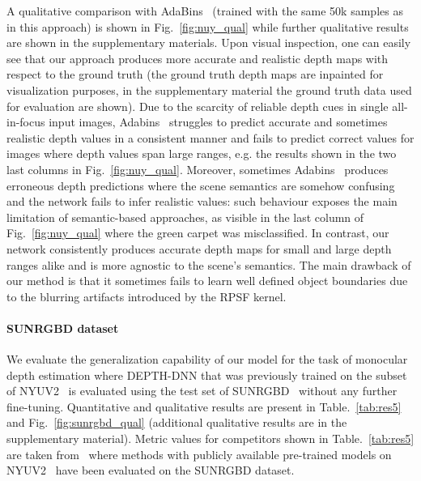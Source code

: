 \documentclass[preprint,5p,twocolumn]{elsarticle}
\begin{document}
A qualitative comparison with AdaBins~\cite{bhat2020adabins} (trained with the same 50k samples as in this approach) is shown in Fig.~\ref{fig:nuy_qual} while further qualitative results are shown in the supplementary materials. Upon visual inspection, one can easily see that our approach produces more accurate and realistic depth maps with respect to the ground truth (the ground truth depth maps are inpainted for visualization purposes, in the supplementary material the ground truth data used for evaluation are shown). 
Due to the scarcity of reliable depth cues in single all-in-focus input images, Adabins~\cite{bhat2020adabins} struggles to predict accurate and sometimes realistic depth values in a consistent manner and fails to predict correct values for images where depth values span large ranges, e.g. the results shown in the two last columns in Fig.~\ref{fig:nuy_qual}. Moreover, sometimes Adabins~\cite{bhat2020adabins} produces erroneous depth predictions where the scene semantics are somehow confusing and the network fails to infer realistic values: such behaviour exposes the main limitation of semantic-based approaches, as visible in the last column of Fig.~\ref{fig:nuy_qual} where the green carpet was misclassified. In contrast, our network consistently produces accurate depth maps for small and large depth ranges alike and is more agnostic to the scene's semantics. The main drawback of our method is that it sometimes fails to learn well defined object boundaries due to the blurring artifacts introduced by the RPSF kernel. 


\paragraph{SUNRGBD dataset}
We evaluate the generalization capability of our model for the task of monocular depth estimation where DEPTH-DNN that was previously trained on the subset of NYUV2~\cite{eigen2014depth} is evaluated using the test set of SUNRGBD~\cite{song2015sun} without any further fine-tuning. Quantitative and qualitative results are present in Table.~\ref{tab:res5} and Fig.~\ref{fig:sunrgbd_qual} (additional qualitative results are in the supplementary material). Metric values for competitors shown in Table.~\ref{tab:res5} are taken from~\cite{bhat2020adabins} where methods with publicly available pre-trained models on NYUV2~\cite{eigen2014depth} have been evaluated on the SUNRGBD dataset.
\end{document}

